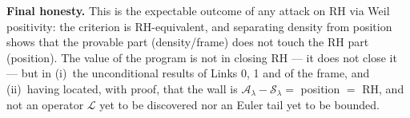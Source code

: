 \documentclass[11pt]{article}
\theoremstyle{plain}
\theoremstyle{definition}
\newcommand{\Sframe}{\mathcal S_\lambda}
\newcommand{\Aweil}{\mathcal A_\lambda}
\begin{document}
\noindent\textbf{Final honesty.} This is the expectable outcome of any attack on RH
via Weil positivity: the criterion is RH-equivalent, and separating density from
position shows that the provable part (density/frame) does not touch the RH part
(position). The value of the program is not in closing RH --- it does not close it
--- but in (i)~the unconditional results of Links 0, 1 and of the frame, and
(ii)~having located, with proof, that the wall is $\Aweil-\Sframe=$ position
$=$ RH, and not an operator $\mathcal L$ yet to be discovered nor an Euler tail
yet to be bounded.
\end{document}
